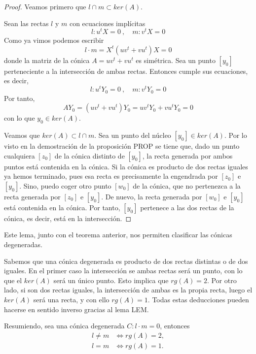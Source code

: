 \begin{proof}
	Veamos primero que $l\cap m\subset ker(A)$. 
	
	Sean las rectas $l$ y $m$ con ecuaciones implícitas
	\begin{equation}
	l:u^tX=0\ , \quad m:v^tX=0
	\end{equation}
	Como ya vimos podemos escribir 
	\begin{equation}
	l\cdot m=X^t(uv^t+vu^t)X=0
	\end{equation}
	donde la matriz de la cónica $A=uv^t+vu^t$ es simétrica. Sea un punto $[y_0]$ perteneciente a la intersección de ambas rectas. Entonces cumple sus ecuaciones, es decir,
	\begin{equation}
	l:u^tY_0=0\ , \quad m:v^tY_0=0
	\end{equation}
	Por tanto,
	\begin{equation}
	AY_0=(uv^t+vu^t)Y_0=uv^tY_0+vu^tY_0=0
	\end{equation}
	con lo que $y_0\in ker(A)$.
	
	Veamos que $ker(A)\subset l\cap m$. Sea un punto del núcleo $[y_0]\in ker(A)$. Por lo visto en la demostración de la proposición PROP se tiene que, dado un punto cualquiera $[z_0]$ de la cónica distinto de $[y_0]$, la recta generada por ambos puntos está contenida en la cónica. Si la cónica es producto de dos rectas iguales ya hemos terminado, pues esa recta es precisamente la engendrada por $[z_0]$ e $[y_0]$. Sino, puedo coger otro punto $[w_0]$ de la cónica, que no pertenezca a la recta generada por $[z_0]$ e $[y_0]$. De nuevo, la recta generada por $[w_0]$ e $[y_0]$ está contenida en la cónica. Por tanto, $[y_0]$ pertenece a las dos rectas de la cónica, es decir, está en la intersección.
\end{proof}
Este lema, junto con el teorema anterior, nos permiten clasificar las cónicas degeneradas. 

Sabemos que una cónica degenerada es producto de dos rectas distintas o de dos iguales. En el primer caso la intersección se ambas rectas será un punto, con lo que el $ker(A)$ será un único punto. Esto implica que $rg(A)=2$. Por otro lado, si son dos rectas iguales, la intersección de ambas es la propia recta, luego el $ker(A)$ será una recta, y con ello $rg(A)=1$. Todas estas deducciones pueden hacerse en sentido inverso gracias al lema LEM.

Resumiendo, sea una cónica degenerada $C:l\cdot m=0$, entonces
\begin{equation}
\begin{split}
l\not=m &\Leftrightarrow rg(A)=2,\\
l=m&\Leftrightarrow rg(A)=1.
\end{split}
\end{equation}

